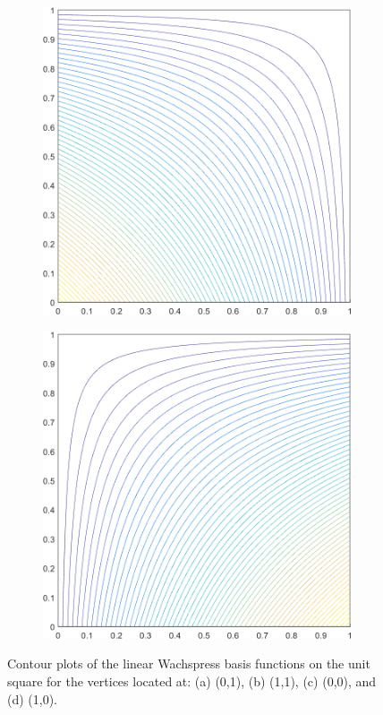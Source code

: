 \begin{figure}
\begin{subfigure}[b]{0.39\textwidth}
		\caption{}
	\end{subfigure}
	\vfill
	\begin{subfigure}[b]{0.39\textwidth}
		\centering
		\includegraphics[width=\textwidth]{figures/sec_BF/square_WACHSPRESS1_contour_b1.png}
		\caption{}
	\end{subfigure}
	\hspace{1.5cm}
	\begin{subfigure}[b]{0.39\textwidth}
		\centering
		\includegraphics[width=\textwidth]{figures/sec_BF/square_WACHSPRESS1_contour_b2.png}
		\caption{}
	\end{subfigure}
\caption{Contour plots of the linear Wachspress basis functions on the unit square for the vertices located at: (a) (0,1), (b) (1,1), (c) (0,0), and (d) (1,0).}
\end{figure}

